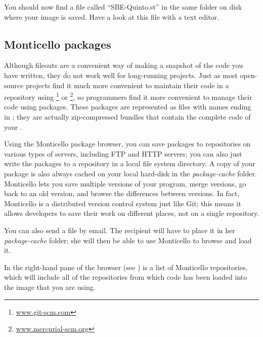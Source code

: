 \documentclass[a4paper,10pt,twoside]{book}
\begin{document}
You should now find a file called ``SBE-Quinto.st'' in the same folder on disk where your image is saved.
Have a look at this file with a text editor.


\subsection{Monticello packages}
Although fileouts are a convenient way of making a snapshot of the code you have written, they do not work well for long-running projects.
Just as most open-source projects find it much more convenient to maintain their code in a repository using \footnote{\url{www.git-scm.com}} or \footnote{\url{www.mercurial-scm.org}}, so \squeak programmers find it more convenient to manage their code using  packages. 
These packages are represented as files with names ending in ; they are actually zip-compressed bundles that contain the complete code of your .

Using the Monticello package browser, you can save packages to repositories on various types of servers, including FTP and HTTP servers; you can also just write the packages to a repository in a local file system directory.
A copy of your package is also always cached on your local hard-disk in the \emph{package-cache} folder. 
Monticello lets you save multiple versions of your program, merge versions, go back to an old version, and browse the differences between versions. 
In fact, Monticello is a distributed version control system just like Git; this means it allows developers to save their work on different places, not on a single repository.

You can also send a  file by email. 
The recipient will have to place it in her \emph{package-cache} folder; she will then be able to use Monticello to browse and load it.

In the right-hand pane of the browser (see ) is a list of Monticello repositories, which will include all of the repositories from which code has been loaded into the image that you are using.  
\end{document}

